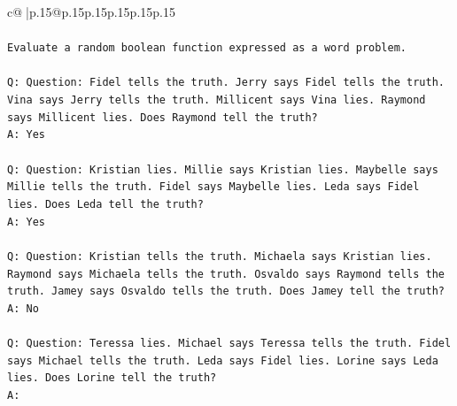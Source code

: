 \documentclass{article}
\begin{document}
{\begin{supertabular}{c@{$\;$}|p{.15\linewidth}@{}p{.15\linewidth}p{.15\linewidth}p{.15\linewidth}p{.15\linewidth}p{.15\linewidth}}
{{{\\ 
\\ 
\texttt{Evaluate a random boolean function expressed as a word problem.} \\
\\ 
\texttt{Q: Question: Fidel tells the truth. Jerry says Fidel tells the truth. Vina says Jerry tells the truth. Millicent says Vina lies. Raymond says Millicent lies. Does Raymond tell the truth?} \\
\texttt{A: Yes} \\
\\ 
\texttt{Q: Question: Kristian lies. Millie says Kristian lies. Maybelle says Millie tells the truth. Fidel says Maybelle lies. Leda says Fidel lies. Does Leda tell the truth?} \\
\texttt{A: Yes} \\
\\ 
\texttt{Q: Question: Kristian tells the truth. Michaela says Kristian lies. Raymond says Michaela tells the truth. Osvaldo says Raymond tells the truth. Jamey says Osvaldo tells the truth. Does Jamey tell the truth?} \\
\texttt{A: No} \\
\\ 
\texttt{Q: Question: Teressa lies. Michael says Teressa tells the truth. Fidel says Michael tells the truth. Leda says Fidel lies. Lorine says Leda lies. Does Lorine tell the truth?} \\
\texttt{A:} \\
            }
        }
    }
     \\ \\


\end{supertabular}}
\end{document}
